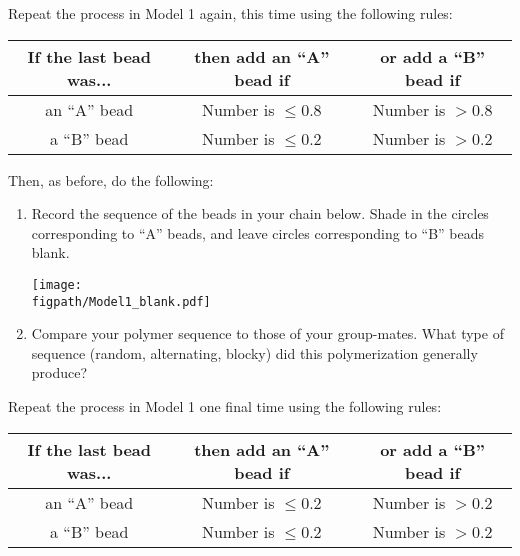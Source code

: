 \begin{activity}[Copolymerization]
\begin{ctqs}
\begin{enumerate}
		\end{enumerate}
		
		\question Repeat the process in Model 1 again, this time using the following rules:	\begin{center}
					\renewcommand{\arraystretch}{1.5}
					\begin{tabular}{|c|c|c|}
						\hline
						\textbf{If the last bead was...} &  \textbf{then add an ``A'' bead if} & \textbf{or add a ``B'' bead if}\\\hline
						 an ``A'' bead & Number is $\leq 0.8$ & Number is $> 0.8$ \\
						 a ``B'' bead & Number is $\leq 0.2$ & Number is $> 0.2$ \\\hline
					\end{tabular}
					\end{center}
	
		Then, as before, do the following:
		\begin{enumerate}
			\item Record the sequence of the beads in your chain below.  Shade in the circles corresponding to ``A'' beads, and leave circles corresponding to ``B'' beads blank.
	
		\vspace{6pt}
		\centerline{\texttt{[image: \\figpath/Model1\_blank.pdf]}}
		
			\item Compare your polymer sequence to those of your group-mates.  What type of sequence (random, alternating, blocky) did this polymerization generally produce?
			
				\begin{solution}[1.5in]
				\end{solution}
		\end{enumerate}
		
	\question Repeat the process in Model 1 one final time using the following rules:	\begin{center}
					\renewcommand{\arraystretch}{1.5}
					\begin{tabular}{|c|c|c|}
						\hline
						\textbf{If the last bead was...} &  \textbf{then add an ``A'' bead if} & \textbf{or add a ``B'' bead if}\\\hline
						 an ``A'' bead & Number is $\leq 0.2$ & Number is $> 0.2$ \\
						 a ``B'' bead & Number is $\leq 0.2$ & Number is $> 0.2$ \\\hline
					\end{tabular}
					\end{center}
	

\end{ctqs}
\end{activity}

